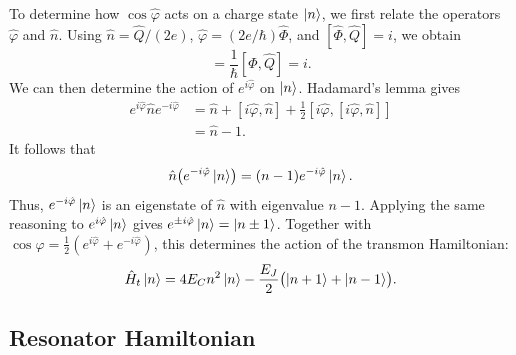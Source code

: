 \documentclass[11pt,a4paper]{article}
\numberwithin{equation}{section}
\begin{document}
To determine how $\cos\hat\varphi$ acts on a charge state $\ket{n}$,
we first relate the operators $\hat\varphi$ and $\hat n$.
Using $\hat n=\hat Q/(2e)$, $\hat\varphi=(2e/\hbar)\hat\Phi$, and
$[\hat\Phi,\hat Q]=i$, we obtain
\begin{equation}
  [\hat\varphi,\hat n] =\frac{1}{\hbar}[\hat\Phi,\hat Q]=i.
\end{equation}
We can then determine the action of $e^{i\hat\varphi}$ on $\ket{n}$.
Hadamard's lemma gives
\begin{equation}
  \begin{aligned}
    e^{i\hat\varphi}\hat n e^{-i\hat\varphi}
      &=\hat n+[i\hat\varphi,\hat n]
        +\frac12[i\hat\varphi,[i\hat\varphi,\hat n]]\\
      &=\hat n-1.
  \end{aligned}
\end{equation}
It follows that
\begin{equation}
  \hat n\bigl(e^{-i\hat\varphi}\ket{n}\bigr) =(n-1)e^{-i\hat\varphi}\ket{n}.
\end{equation}
Thus, $e^{-i\hat\varphi}\ket{n}$ is an eigenstate of $\hat n$ with
eigenvalue $n-1$. Applying the same reasoning to
$e^{i\hat\varphi}\ket{n}$ gives
$e^{\pm i\hat\varphi}\ket{n}=\ket{n\pm1}$.
Together with
$\cos\varphi=\tfrac12(e^{i\hat\varphi}+e^{-i\hat\varphi})$,
this determines the action of the transmon Hamiltonian:
\begin{equation}
  \hat H_t\ket{n} =4E_Cn^2\ket{n} -\frac{E_J}{2}\bigl(\ket{n+1}+\ket{n-1}\bigr).
\end{equation}

\subsection{Resonator Hamiltonian}
\end{document}
